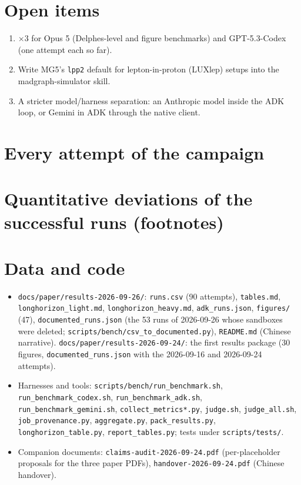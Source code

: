 \documentclass[10pt,a4paper]{article}
\newcommand{\code}[1]{\texttt{#1}}
\begin{document}
\section{Open items}
\begin{enumerate}
\item $\times$3 for Opus 5 (Delphes-level and figure benchmarks) and GPT-5.3-Codex (one attempt each so far).
\item Write MG5's \code{lpp2} default for lepton-in-proton (LUXlep) setups into the madgraph-simulator skill.
\item A stricter model/harness separation: an Anthropic model inside the ADK loop, or Gemini in ADK through the native client.
\end{enumerate}

\appendix
\section{Every attempt of the campaign}
\scriptsize\setlength{\tabcolsep}{3pt}

\normalsize

\section{Quantitative deviations of the successful runs (footnotes)}
\scriptsize

\normalsize

\section{Data and code}
\begin{itemize}\small
\item \code{docs/paper/results-2026-09-26/}: \code{runs.csv} (90 attempts), \code{tables.md}, \code{longhorizon\_light.md}, \code{longhorizon\_heavy.md}, \code{adk\_runs.json}, \code{figures/} (47), \code{documented\_runs.json} (the 53 runs of 2026-09-26 whose sandboxes were deleted; \code{scripts/bench/csv\_to\_documented.py}), \code{README.md} (Chinese narrative). \code{docs/paper/results-2026-09-24/}: the first results package (30 figures, \code{documented\_runs.json} with the 2026-09-16 and 2026-09-24 attempts).
\item Harnesses and tools: \code{scripts/bench/run\_benchmark.sh}, \code{run\_benchmark\_codex.sh}, \code{run\_benchmark\_adk.sh}, \code{run\_benchmark\_gemini.sh}, \code{collect\_metrics*.py}, \code{judge.sh}, \code{judge\_all.sh}, \code{job\_provenance.py}, \code{aggregate.py}, \code{pack\_results.py}, \code{longhorizon\_table.py}, \code{report\_tables.py}; tests under \code{scripts/tests/}.
\item Companion documents: \code{claims-audit-2026-09-24.pdf} (per-placeholder proposals for the three paper PDFs), \code{handover-2026-09-24.pdf} (Chinese handover).
\end{itemize}
\end{document}
